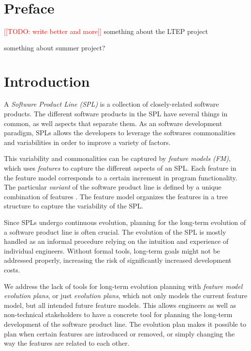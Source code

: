 \documentclass[a4paper,english]{ifimaster}
\newcommand{\todo}[1]{\textcolor{red}{[[TODO: #1]]}\PackageWarning{TODO:}{#1!}}
\begin{document}
\tableofcontents{}
\listoffigures{}
\listoftables{}

\chapter*{Preface}

\todo{write better and more}
something about the LTEP project

something about summer project?

\mainmatter{}

\chapter{Introduction}%
\label{cha:introduction}

A \textit{Software Product Line (SPL)} is a collection of closely-related software products. The different software products in the SPL have several things in common, as well aspects that separate them. As an software development paradigm, SPLs allows the developers to leverage the softwares commonalities and variabilities in order to improve a variety of factors.

This variability and commonalities can be captured by \textit{feature models (FM)}, which uses \textit{features} to capture the different aspects of an SPL. Each feature in the feature model corresponds to a certain increment in program functionality. The particular \textit{variant} of the software product line is defined by a unique combination of features \cite{cite:don_batory_fm_grammar_prop}. The feature model organizes the features in a tree structure to capture the variability of the SPL.

Since SPLs undergo continuous evolution, planning for the long-term evolution of a software product line is often crucial. The evolution of the SPL is mostly handled as an informal procedure relying on the intuition and experience of individual engineers. Without formal tools, long-term goals might not be addressed properly, increasing the risk of significantly increased development costs.

We address the lack of tools for long-term evolution planning with \textit{feature model evolution plans}, or just \textit{evolution plans}, which not only models the current feature model, but all intended future feature models. This allows engineers as well as non-technical stakeholders to have a concrete tool for planning the long-term development of the software product line. The evolution plan makes it possible to plan when certain features are introduced or removed, or simply changing the way the features are related to each other. 
\end{document}
